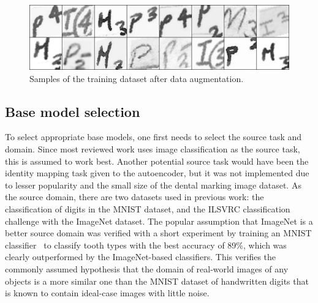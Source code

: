 \documentclass[english,twoside,openright]{UH_DS_MSc}
\begin{document}
\begin{figure}[ht]
    \centering
    \includegraphics*[scale=.2]{images/augmented.png}
    \caption{Samples of the training dataset after data augmentation.}
    \label{image:augmented}
\end{figure}

\subsection{Base model selection}

To select appropriate base models, one first needs to select the source task and domain. Since most reviewed work uses image classification as the source task, this is assumed to work best.
Another potential source task would have been the identity mapping task given to the autoencoder,
but it was not implemented due to lesser popularity and the small size of the dental marking image dataset.
As the source domain, there are two datasets used in previous work: the classification of digits in the MNIST dataset, 
and the ILSVRC classification challenge with the ImageNet dataset. The popular 
assumption that ImageNet is a better source domain was verified with a short experiment by training an MNIST classifier~\cite{jamilemnist}
to classify tooth types with the best accuracy of 89\%, which was clearly outperformed by the ImageNet-based classifiers. This verifies the commonly assumed hypothesis that the domain of real-world images of any objects is a more 
similar one than the MNIST dataset of handwritten digits that is known to contain ideal-case images with little noise.
\end{document}
